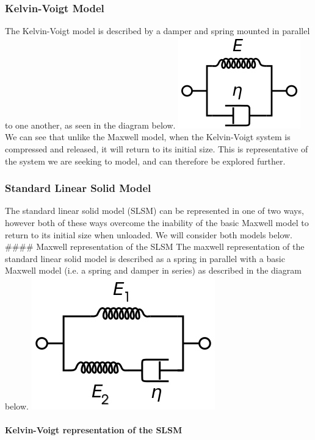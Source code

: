 \documentclass[11pt]{article}
\makeatletter
\def\maxwidth{\ifdim\Gin@nat@width>\linewidth\linewidth
    \else\Gin@nat@width\fi}
\let\Oldincludegraphics\includegraphics
\renewcommand{\includegraphics}[1]{\Oldincludegraphics[width=.8\maxwidth]{#1}}
\makeatother
\begin{document}
    \subsubsection{Kelvin-Voigt Model}\label{kelvin-voigt-model}

The Kelvin-Voigt model is described by a damper and spring mounted in
parallel to one another, as seen in the diagram below.
\includegraphics{images/kelvin-voigt.png} We can see that unlike the
Maxwell model, when the Kelvin-Voigt system is compressed and released,
it will return to its initial size. This is representative of the system
we are seeking to model, and can therefore be explored further.

    \subsubsection{Standard Linear Solid
Model}\label{standard-linear-solid-model}

The standard linear solid model (SLSM) can be represented in one of two
ways, however both of these ways overcome the inability of the basic
Maxwell model to return to its initial size when unloaded. We will
consider both models below. \#\#\#\# Maxwell representation of the SLSM
The maxwell representation of the standard linear solid model is
described as a spring in parallel with a basic Maxwell model (i.e. a
spring and damper in series) as described in the diagram below.
\includegraphics{images/standard-maxwell.png}

\paragraph{Kelvin-Voigt representation of the
SLSM}\label{kelvin-voigt-representation-of-the-slsm}
\end{document}
